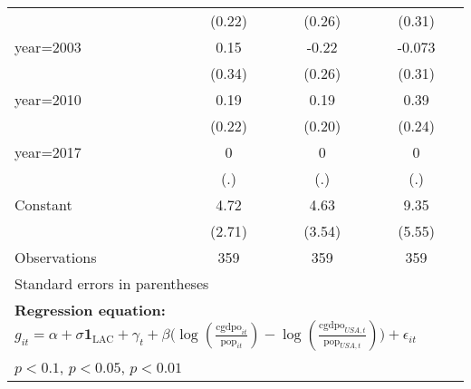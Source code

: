 \begin{sidewaystable}[htbp]
\begin{tabular}{l*{3}{c}}
                &   (0.22)         &   (0.26)         &   (0.31)         \\
\addlinespace
year=2003       &     0.15         &    -0.22         &   -0.073         \\
                &   (0.34)         &   (0.26)         &   (0.31)         \\
\addlinespace
year=2010       &     0.19         &     0.19         &     0.39         \\
                &   (0.22)         &   (0.20)         &   (0.24)         \\
\addlinespace
year=2017       &        0         &        0         &        0         \\
                &      (.)         &      (.)         &      (.)         \\
\addlinespace
Constant        &     4.72\sym{*}  &     4.63         &     9.35\sym{*}  \\
                &   (2.71)         &   (3.54)         &   (5.55)         \\
\midrule
Observations    &      359         &      359         &      359         \\
\bottomrule
\multicolumn{4}{l}{\footnotesize Standard errors in parentheses}\\
\multicolumn{4}{l}{\footnotesize \textbf{Regression equation:} \(g_{it} = \alpha + \sigma \mathbf{1}_{\textrm{LAC}} + \gamma_t + \beta \big(\log (\frac{\textrm{cgdpo}_{it}}{\textrm{pop}_{it}} ) - \log (\frac{\textrm{cgdpo}_{USA,t}}{\textrm{pop}_{USA,t}}  ) \big) + \epsilon_{it}\)}\\
\multicolumn{4}{l}{\footnotesize \sym{*} \(p<0.1\), \sym{**} \(p<0.05\), \sym{***} \(p<0.01\)}\\
\end{tabular}
\end{sidewaystable}
